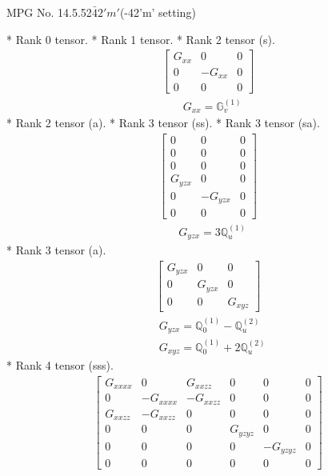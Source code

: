 \documentclass[fleqn,8pt,landscape]{jsarticle}
\begin{document}
\setcounter{MaxMatrixCols}{32}

\renewcommand{\tablename}{Table~}
\renewcommand{\figurename}{Figure~}
\begin{center}
\LARGE
MPG No. 14.5.52\quad$\bar{4}2'm'$\quad(-42'm' setting)
\end{center}
* Rank 0 tensor.
* Rank 1 tensor.
* Rank 2 tensor (s).
\begin{align*}
\begin{bmatrix} G_{xx} & 0 & 0 \\ 0 & - G_{xx} & 0 \\ 0 & 0 & 0 \end{bmatrix}
\end{align*}
\begin{align*}
& G_{xx} = \mathbb{G}_{v}^{(1)}
\end{align*}
* Rank 2 tensor (a).
* Rank 3 tensor (ss).
* Rank 3 tensor (sa).
\begin{align*}
\begin{bmatrix} 0 & 0 & 0 \\ 0 & 0 & 0 \\ 0 & 0 & 0 \\ G_{yzx} & 0 & 0 \\ 0 & - G_{yzx} & 0 \\ 0 & 0 & 0 \end{bmatrix}
\end{align*}
\begin{align*}
& G_{yzx} = 3 \mathbb{Q}_{u}^{(1)}
\end{align*}
* Rank 3 tensor (a).
\begin{align*}
\begin{bmatrix} G_{yzx} & 0 & 0 \\ 0 & G_{yzx} & 0 \\ 0 & 0 & G_{xyz} \end{bmatrix}
\end{align*}
\begin{align*}
& G_{yzx} = \mathbb{Q}_{0}^{(1)} - \mathbb{Q}_{u}^{(2)} \\
& G_{xyz} = \mathbb{Q}_{0}^{(1)} + 2 \mathbb{Q}_{u}^{(2)}
\end{align*}
* Rank 4 tensor (sss).
\begin{align*}
\begin{bmatrix} G_{xxxx} & 0 & G_{xxzz} & 0 & 0 & 0 \\ 0 & - G_{xxxx} & - G_{xxzz} & 0 & 0 & 0 \\ G_{xxzz} & - G_{xxzz} & 0 & 0 & 0 & 0 \\ 0 & 0 & 0 & G_{yzyz} & 0 & 0 \\ 0 & 0 & 0 & 0 & - G_{yzyz} & 0 \\ 0 & 0 & 0 & 0 & 0 & 0 \end{bmatrix}
\end{align*}
\end{document}
